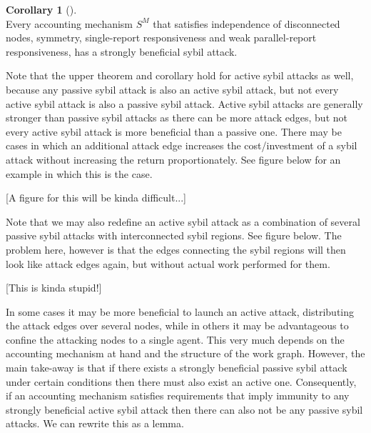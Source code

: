 \documentclass[11pt,a4paper]{report}
\theoremstyle{definition}
\theoremstyle{theorem}
\theoremstyle{proposition}
\theoremstyle{corollary}
\newtheorem{corollary}{Corollary}[section]
\theoremstyle{lemma}
\theoremstyle{example}
\theoremstyle{remark}
\begin{document}
\begin{corollary}[]\ \\
Every accounting mechanism $S^M$ that satisfies independence of disconnected nodes, symmetry, single-report responsiveness and weak parallel-report responsiveness, has a strongly beneficial sybil attack.
\end{corollary}

\noindent{}Note that the upper theorem and corollary hold for active sybil attacks as well, because any passive sybil attack is also an active sybil attack, but not every active sybil attack is also a passive sybil attack. Active sybil attacks are generally stronger than passive sybil attacks as there can be more attack edges, but not every active sybil attack is more beneficial than a passive one. There may be cases in which an additional attack edge increases the cost/investment of a sybil attack without increasing the return proportionately. See figure below for an example in which this is the case. \begin{center} [A figure for this will be kinda difficult...] \vspace{1em}\\ \end{center}

\noindent{}Note that we may also redefine an active sybil attack as a combination of several passive sybil attacks with interconnected sybil regions. See figure below. The problem here, however is that the edges connecting the sybil regions will then look like attack edges again, but without actual work performed for them. \begin{center}[This is kinda stupid!]\vspace{1em}\\ \end{center}

\noindent{}In some cases it may be more beneficial to launch an active attack, distributing the attack edges over several nodes, while in others it may be advantageous to confine the attacking nodes to a single agent. This very much depends on the accounting mechanism at hand and the structure of the work graph. However, the main take-away is that if there exists a strongly beneficial passive sybil attack under certain conditions then there must also exist an active one. Consequently, if an accounting mechanism satisfies requirements that imply immunity to any strongly beneficial active sybil attack then there can also not be any passive sybil attacks. We can rewrite this as a lemma. \vspace{1em}\\
\end{document}
